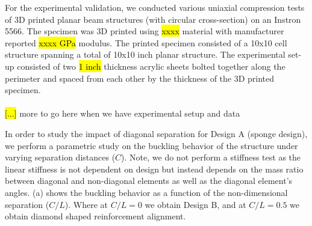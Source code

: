 \documentclass[9pt,twocolumn,twoside]{fernandes_paper}
\newcommand{\mf}[1]{\colorbox{blue!10}{\color{color3}#1}}
\begin{document}
For the experimental validation, we conducted various uniaxial compression tests of 3D printed planar beam structures (with circular cross-section) on an Instron 5566. The specimen was 3D printed using \hl{xxxx} material with manufacturer reported \hl{xxxx GPa} modulus. The printed specimen consisted of a 10x10 cell structure spanning a total of 10x10 inch planar structure. The experimental set-up consisted of two \hl{1 inch} thickness acrylic sheets bolted together along the perimeter and spaced from each other by the thickness of the 3D printed specimen.\\\\\hl{[...]} \mf{more to go here when we have experimental setup and data}



In order to study the impact of diagonal separation for Design A (sponge design), we perform a parametric study on the buckling behavior of the structure under varying separation distances ($C$). Note, we do not perform a stiffness test as the linear stiffness is not dependent on design but instead depends on the mass ratio between diagonal and non-diagonal elements as well as the diagonal element's angles. (a) shows the buckling behavior as a function of the non-dimensional separation ($C/L$). Where at $C/L=0$ we obtain Design B, and at $C/L=0.5$ we obtain diamond shaped reinforcement alignment. 

\end{document}
